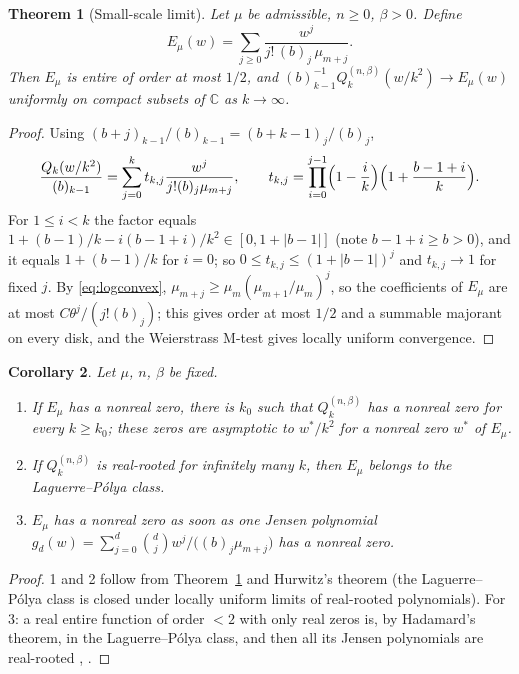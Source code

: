 \documentclass[11pt,a4paper]{article}
\newtheorem{theorem}{Theorem}[section]
\newtheorem{corollary}[theorem]{Corollary}
\theoremstyle{definition}
\theoremstyle{remark}
\begin{document}
\begin{theorem}[Small-scale limit]\label{thm:limit}
Let $\mu$ be admissible, $n\ge0$, $\beta>0$. Define
\begin{equation}\label{eq:E}
 E_\mu(w)=\sum_{j\ge0}\frac{w^j}{j!\,(b)_j\,\mu_{m+j}} .
\end{equation}
Then $E_\mu$ is entire of order at most $1/2$, and
$(b)_{k-1}^{-1}Q_k^{(n,\beta)}(w/k^2)\to E_\mu(w)$ uniformly on compact
subsets of $\mathbb C$ as $k\to\infty$.
\end{theorem}
\begin{proof}
Using $(b+j)_{k-1}/(b)_{k-1}=(b+k-1)_j/(b)_j$,
\[
 \frac{Q_k(w/k^2)}{(b)_{k-1}}=\sum_{j=0}^k t_{k,j}\frac{w^j}{j!(b)_j\mu_{m+j}},
 \qquad t_{k,j}=\prod_{i=0}^{j-1}\Bigl(1-\frac ik\Bigr)\Bigl(1+\frac{b-1+i}{k}\Bigr).
\]
For $1\le i<k$ the factor equals $1+(b-1)/k-i(b-1+i)/k^2\in[0,1+|b-1|]$
(note $b-1+i\ge b>0$), and it equals $1+(b-1)/k$ for $i=0$; so
$0\le t_{k,j}\le(1+|b-1|)^j$ and $t_{k,j}\to1$ for fixed $j$. By
\eqref{eq:logconvex}, $\mu_{m+j}\ge\mu_m(\mu_{m+1}/\mu_m)^j$, so the
coefficients of $E_\mu$ are at most $C\theta^j/(j!(b)_j)$; this gives order
at most $1/2$ and a summable majorant on every disk, and the Weierstrass
M-test gives locally uniform convergence.
\end{proof}

\begin{corollary}\label{cor:hurwitz}
Let $\mu$, $n$, $\beta$ be fixed.
\begin{enumerate}
\item If $E_\mu$ has a nonreal zero, there is $k_0$ such that
$Q_k^{(n,\beta)}$ has a nonreal zero for every $k\ge k_0$; these zeros are
asymptotic to $w^*/k^2$ for a nonreal zero $w^*$ of $E_\mu$.
\item If $Q_k^{(n,\beta)}$ is real-rooted for infinitely many $k$, then
$E_\mu$ belongs to the Laguerre--Pólya class.
\item $E_\mu$ has a nonreal zero as soon as one Jensen polynomial
$g_d(w)=\sum_{j=0}^d\binom dj w^j/\bigl((b)_j\mu_{m+j}\bigr)$ has a nonreal zero.
\end{enumerate}
\end{corollary}
\begin{proof}
1 and 2 follow from Theorem~\ref{thm:limit} and Hurwitz's theorem
(the Laguerre--Pólya class is closed under locally uniform limits of
real-rooted polynomials). For 3: a real entire function of order
$<2$ with only real zeros is, by Hadamard's theorem, in the
Laguerre--Pólya class, and then all its Jensen polynomials are real-rooted
\cite{PolyaSchur1914}, \cite[\S1]{CravenCsordas1989}.
\end{proof}
\end{document}
